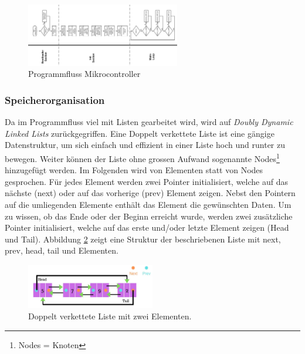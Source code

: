 \begin{figure}[H]
	\centering
	\includegraphics[angle = 270, width=0.6\textwidth]{graphics/ProgrammflussMikrokontroller}
	\caption{Programmfluss Mikrocontroller}
	\label{fig:Programmfluss_Atmega2560}
\end{figure}

\subsubsection{Speicherorganisation}\label{subsubsec:Speicherorganisation}

Da im Programmfluss viel mit Listen gearbeitet wird, wird auf \textit{Doubly Dynamic Linked Lists} zurückgegriffen.
Eine Doppelt verkettete Liste ist eine gängige Datenstruktur, um sich einfach und effizient in einer Liste hoch und runter zu bewegen. Weiter können der Liste ohne grossen Aufwand sogenannte Nodes\footnote{Nodes = Knoten} hinzugefügt werden. Im Folgenden wird von Elementen statt von Nodes gesprochen. Für jedes Element werden zwei Pointer initialisiert, welche auf das nächste (next) oder auf das vorherige (prev) Element zeigen. Nebst den Pointern auf die umliegenden Elemente enthält das Element die gewünschten Daten. Um zu wissen, ob das Ende oder der Beginn erreicht wurde, werden zwei zusätzliche Pointer initialisiert, welche auf das erste und/oder letzte Element zeigen (Head und Tail).
Abbildung \ref{fig:Doubly_Linked_List_2_00} zeigt eine Struktur der beschriebenen Liste mit next, prev, head, tail und Elementen. \cite{lenz_artikel_2016}

\begin{figure}[h!]
	\centering
	\includegraphics[width=0.5\textwidth]{graphics/Doubly_Linked_List_2_00}
	\caption{Doppelt verkettete Liste mit zwei Elementen.\cite{yadav_circular_2019}}
	\label{fig:Doubly_Linked_List_2_00}
\end{figure}


